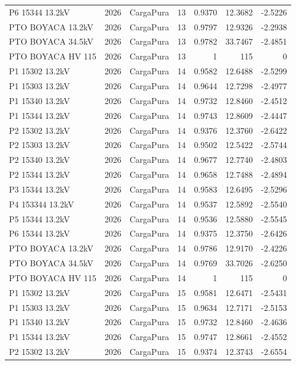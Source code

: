 \documentclass[11pt,a4paper]{article}
\begin{document}
\begin{longtable}{llllrrr}
P6 15344 13.2kV & 2026 & CargaPura & 13 & 0.9370 & 12.3682 & -2.5226 \\
PTO BOYACA 13.2kV & 2026 & CargaPura & 13 & 0.9797 & 12.9326 & -2.2938 \\
PTO BOYACA 34.5kV & 2026 & CargaPura & 13 & 0.9782 & 33.7467 & -2.4851 \\
PTO BOYACA HV 115 & 2026 & CargaPura & 13 & 1 & 115 & 0 \\
P1 15302 13.2kV & 2026 & CargaPura & 14 & 0.9582 & 12.6488 & -2.5299 \\
P1 15303 13.2kV & 2026 & CargaPura & 14 & 0.9644 & 12.7298 & -2.4977 \\
P1 15340 13.2kV & 2026 & CargaPura & 14 & 0.9732 & 12.8460 & -2.4512 \\
P1 15344 13.2kV & 2026 & CargaPura & 14 & 0.9743 & 12.8609 & -2.4447 \\
P2 15302 13.2kV & 2026 & CargaPura & 14 & 0.9376 & 12.3760 & -2.6422 \\
P2 15303 13.2kV & 2026 & CargaPura & 14 & 0.9502 & 12.5422 & -2.5744 \\
P2 15340 13.2kV & 2026 & CargaPura & 14 & 0.9677 & 12.7740 & -2.4803 \\
P2 15344 13.2kV & 2026 & CargaPura & 14 & 0.9658 & 12.7488 & -2.4894 \\
P3 15344 13.2kV & 2026 & CargaPura & 14 & 0.9583 & 12.6495 & -2.5296 \\
P4 153344 13.2kV & 2026 & CargaPura & 14 & 0.9537 & 12.5892 & -2.5540 \\
P5 15344 13.2kV & 2026 & CargaPura & 14 & 0.9536 & 12.5880 & -2.5545 \\
P6 15344 13.2kV & 2026 & CargaPura & 14 & 0.9375 & 12.3750 & -2.6426 \\
PTO BOYACA 13.2kV & 2026 & CargaPura & 14 & 0.9786 & 12.9170 & -2.4226 \\
PTO BOYACA 34.5kV & 2026 & CargaPura & 14 & 0.9769 & 33.7026 & -2.6250 \\
PTO BOYACA HV 115 & 2026 & CargaPura & 14 & 1 & 115 & 0 \\
P1 15302 13.2kV & 2026 & CargaPura & 15 & 0.9581 & 12.6471 & -2.5431 \\
P1 15303 13.2kV & 2026 & CargaPura & 15 & 0.9634 & 12.7171 & -2.5153 \\
P1 15340 13.2kV & 2026 & CargaPura & 15 & 0.9732 & 12.8460 & -2.4636 \\
P1 15344 13.2kV & 2026 & CargaPura & 15 & 0.9747 & 12.8661 & -2.4552 \\
P2 15302 13.2kV & 2026 & CargaPura & 15 & 0.9374 & 12.3743 & -2.6554 \\

\end{longtable}
\end{document}
